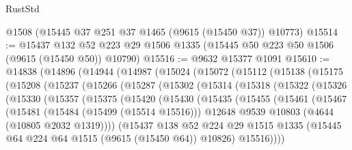 \begin{lexlean}{RustStd}
\begin{coremodule}
    @1508
    (@15445 @37 @251 @37 @1465 (@9615 (@15450 @37)) @10773)
@15514 := @15437
    @132
    @52
    @223
    @29
    @1506
    @1335
    (@15445 @50 @223 @50 @1506 (@9615 (@15450 @50)) @10790)
@15516 := @9632 @15377 @1091
@15610 := @14838
    (@14896
      (@14944
        (@14987
          (@15024
            (@15072
              (@15112
                (@15138
                  (@15175
                    (@15208
                      (@15237
                        (@15266
                          (@15287
                            (@15302
                              (@15314
                                (@15318
                                  (@15322
                                    (@15326
                                      (@15330
                                        (@15357
                                          (@15375
                                            (@15420
                                              (@15430
                                                (@15435
                                                  (@15455
                                                    (@15461
                                                      (@15467
                                                        (@15481
                                                          (@15484 (@15499 (@15514 @15516)))
                                                          @12648
                                                          @9539
                                                          @10803
                                                          (@4644 (@10805 @2032 @1319))))
                                                      (@15437
                                                        @138
                                                        @52
                                                        @224
                                                        @29
                                                        @1515
                                                        @1335
                                                        (@15445
                                                          @64
                                                          @224
                                                          @64
                                                          @1515
                                                          (@9615 (@15450 @64))
                                                          @10826)
                                                        @15516))))

\end{coremodule}
\end{lexlean}
